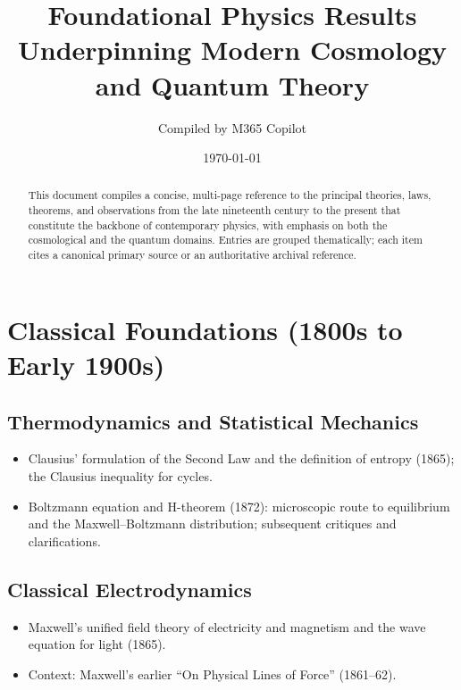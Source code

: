 \documentclass[11pt]{article}
\title{Foundational Physics Results Underpinning Modern Cosmology and Quantum Theory}
\author{Compiled by M365 Copilot}
\date{\today}
\begin{document}
\maketitle
\begin{abstract}
This document compiles a concise, multi-page reference to the principal theories, laws, theorems, and observations from the late nineteenth century to the present that constitute the backbone of contemporary physics, with emphasis on both the cosmological and the quantum domains. Entries are grouped thematically; each item cites a canonical primary source or an authoritative archival reference.
\end{abstract}
\tableofcontents
\newpage
\section{Classical Foundations (1800s to Early 1900s)}
\subsection{Thermodynamics and Statistical Mechanics}
\begin{itemize}
  \item Clausius' formulation of the Second Law and the definition of entropy (1865); the Clausius inequality for cycles. \citep{Clausius1865,ClausiusTrans}
  \item Boltzmann equation and H-theorem (1872): microscopic route to equilibrium and the Maxwell--Boltzmann distribution; subsequent critiques and clarifications. \citep{UffinkH,WikiHThm}
\end{itemize}
\subsection{Classical Electrodynamics}
\begin{itemize}
  \item Maxwell's unified field theory of electricity and magnetism and the wave equation for light (1865). \citep{Maxwell1865}
  \item Context: Maxwell's earlier ``On Physical Lines of Force'' (1861--62). \citep{MaxwellLines}
\end{itemize}
\end{document}
